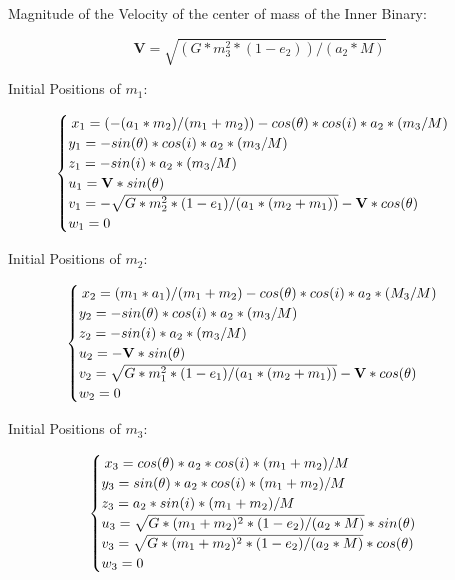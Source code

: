 \documentclass[letterpaper,12pt]{article}
\begin{document}
Magnitude of the Velocity of the center of mass of the Inner Binary:

\begin{equation}
\textbf{V} = \sqrt{(G*m_{3}^{2}*(1-e_{2}))/(a_{2}*M)}
\end{equation}

Initial Positions of $m_{1}$:

\begin{equation}
\begin{cases}
\hspace{0.22em} x_{1} = (-(a_{1}*m_{2})/(m_{1}+m_{2}))-cos(\theta)*cos(i)*a_{2}*(m_{3}/M)\\
y_{1} = -sin(\theta)*cos(i)*a_{2}*(m_{3}/M)\\
z_{1} = -sin(i)*a_{2}*(m_{3}/M)\\
u_{1} = \textbf{V}*sin(\theta)\\
v_{1} = -\sqrt{G*m_{2}^{2}*(1-e_{1})/(a_{1}*(m_{2}+m_{1}))}-\textbf{V}*cos(\theta)\\
w_{1} = 0
\end{cases}
\label{eq:potential}
\end{equation}

Initial Positions of $m_{2}$:

\begin{equation}
\begin{cases}
\hspace{0.22em} x_{2} = (m_{1}*a_{1})/(m_{1} + m_{2})-cos(\theta)*cos(i)*a_{2}*(M_{3}/M)\\
y_{2} = -sin(\theta)*cos(i)*a_{2}*(m_{3}/M)\\
z_{2} = -sin(i)*a_{2}*(m_{3}/M)\\
u_{2} = -\textbf{V}*sin(\theta)\\
v_{2} = \sqrt{G*m_{1}^{2}*(1-e_{1})/(a_{1}*(m_{2}+m_{1}))}-\textbf{V}*cos(\theta)\\
w_{2} = 0
\end{cases}
\label{eq:potential}
\end{equation}

Initial Positions of $m_{3}$:

\begin{equation}
\begin{cases}
\hspace{0.22em} x_{3} = cos(\theta)*a_{2}*cos(i)*(m_{1}+m_{2})/M\\
y_{3} = sin(\theta)*a_{2}*cos(i)*(m_{1}+m_{2})/M\\
z_{3} = a_{2}*sin(i)*(m_{1}+m_{2})/M\\
u_{3} = \sqrt{G*(m_{1}+m_{2})^{2}*(1-e_{2})/(a_{2}*M)}*sin(\theta)\\
v_{3} = \sqrt{G*(m_{1}+m_{2})^{2}*(1-e_{2})/(a_{2}*M)}*cos(\theta)\\
w_{3} = 0
\end{cases}
\label{eq:potential}
\end{equation}
\end{document}
